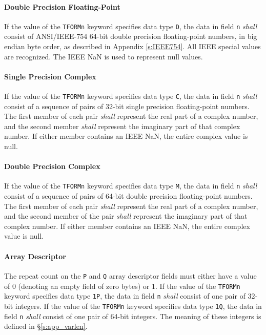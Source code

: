 \documentclass[11pt,makeidx]{book}     %
\begin{document}
    \paragraph{Double Precision Floating-Point}
    If the value of the {\tt TFORMn} keyword 
    specifies data type {\tt D}, the data in 
    field {\tt n} {\em shall} consist of ANSI/IEEE-754 \cite{ieee85} 
    64-bit double precision floating-point 
    numbers, in big endian byte order, as described in Appendix \ref{s:IEEE754}.   
    All IEEE special values are recognized.
    The IEEE NaN is used to represent null values.

    \paragraph{Single Precision Complex}
    If the value of the {\tt TFORMn} keyword 
    specifies data type {\tt C}, the data in 
    field {\tt n} {\em shall} consist of a sequence of pairs of 
    32-bit single precision 
    floating-point numbers.
    The first member of each pair {\em shall} represent the real part 
    of a complex number, and the second member 
    {\em shall} represent the imaginary part of that complex number.
    If either member contains an IEEE NaN, the entire complex value 
    is null.

    \paragraph{Double Precision Complex}
    If the value of the {\tt TFORMn} keyword 
    specifies data type {\tt M}, the data in 
    field {\tt n} {\em shall} consist of a sequence of pairs of 
    64-bit double precision floating-point numbers.
    The first member of each pair {\em shall} represent the real part 
    of a complex number, and the second member of the pair 
    {\em shall} represent the imaginary part of that complex number.
    If either member contains an IEEE NaN, the entire complex value 
    is null.

    \paragraph{Array Descriptor}
    The repeat count on the {\tt P} and {\tt Q} array descriptor
    fields must either have a value of 0 (denoting an empty field of zero bytes) 
    or 1. If the value of the {\tt TFORMn} keyword 
    specifies data type {\tt 1P}, the data in 
    field {\tt n} {\em shall} consist of  
    one pair of 32-bit integers.
    If the value of the {\tt TFORMn} keyword 
    specifies data type {\tt 1Q}, the data in 
    field {\tt n} {\em shall} consist of 
    one pair of 64-bit integers.
    The meaning of these integers is defined
    in \S\ref{s:app_varlen}.
\end{document}

